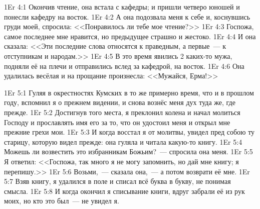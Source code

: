 \vs 1Er 4:1
Окончив чтение, она встала с кафедры;
и пришли четверо юношей и понесли кафедру на восток.
\vs 1Er 4:2
А она подозвала меня к себе и, коснувшись груди моей, спросила:
<<Понравилось ли тебе мое чтение?>>
\vs 1Er 4:3
Госпожа, самое последнее мне нравится,
но предыдущее страшно и жестоко.
\vs 1Er 4:4
И она сказала:
<<Эти последние слова относятся к праведным,
а первые~--- к отступникам и народам.>>
\vs 1Er 4:5
В это время явились 2 каких-то мужа,
подняли её на плечи и отправились вслед за кафедрой, на восток.
\vs 1Er 4:6
Она удалилась весёлая и на прощание произнесла:
<<Мужайся, Ерма!>>

\vs 1Er 5:1
Гуляя в окрестностях Кумских в то же примерно время,
что и в прошлом году, вспомнил я о прежнем видении,
и снова вознёс меня дух туда же, где прежде.
\vs 1Er 5:2
Достигнув того места,
я преклонил колена и начал молиться Господу
и прославлять имя его за то, что он удостоил меня
и открыл мне прежние грехи мои.
\vs 1Er 5:3
И когда восстал я от молитвы,
увидел пред собою ту старицу,
которую видел прежде: она гуляла и читала какую-то книгу.
\vs 1Er 5:4
Можешь ли возвестить это избранникам Божьим?~--- спросила она меня.
\vs 1Er 5:5
Я ответил:
<<Госпожа, так много я не могу запомнить, но дай мне книгу; я перепишу.>>
\vs 1Er 5:6
Возьми,~--- сказала она,~--- а потом возврати её мне.
\vs 1Er 5:7
Взяв книгу, я удалился в поле и списал всё буква в букву,
не понимая смысла.
\vs 1Er 5:8
И когда окончил я списывание книги,
вдруг забрали её из рук моих, но кто это был~--- не увидел я.

